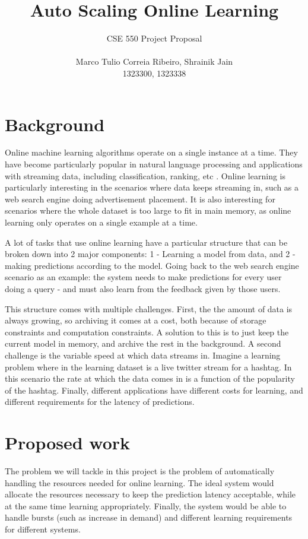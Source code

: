 \documentclass[letterpaper]{article}
\title{Auto Scaling Online Learning}
\date{}
\begin{document}
\author{CSE 550 Project Proposal \\\\ Marco Tulio Correia Ribeiro, Shrainik Jain\\ 1323300, 1323338}
\maketitle

\section{Background}
Online machine learning algorithms operate on a single instance at a time. They
have become particularly popular in natural language processing and applications
with streaming data, including classification, ranking, etc
\cite{Bordes:2005:HSE:2130928.2130979,
Carvalho:2006:SOL:1150402.1150466, Dredze:2008:CLC:1390156.1390190}. Online
learning is particularly interesting in the scenarios where data keeps streaming
in, such as a web search engine doing advertisement placement. It is also
interesting for scenarios where the whole dataset is too large to fit in main
memory, as online learning only operates on a single example at a time.

A lot of tasks that use online learning have a particular structure that can be 
broken down into 2 major components: 1 - Learning a model from data, and 2 -
making predictions according to the model. Going back to the web search engine
scenario as an example: the system needs to make predictions for every user
doing a query - and must also learn from the feedback given by those users.

This structure comes with multiple challenges. First, the 
the amount of data is always growing, so archiving it comes at a cost, both
because of storage constraints and computation constraints. A solution to this
is to just keep the current model in memory, and archive the rest in the
background. A second challenge is the
variable speed at which data streams in. Imagine a learning problem where in the
learning dataset is a live twitter stream for a hashtag. In this scenario the
rate at which the data comes in is a function of the popularity of the hashtag.
Finally, different applications have different costs for learning, and different
requirements for the latency of predictions.

\section{Proposed work}
The problem we will tackle in this project is the problem of automatically
handling the resources needed for online learning. The ideal system would
allocate the resources necessary to keep the prediction latency acceptable,
while at the same time learning appropriately. Finally, the system would be able
to handle bursts (such as increase in demand) and different learning
requirements for different systems.
\end{document}
